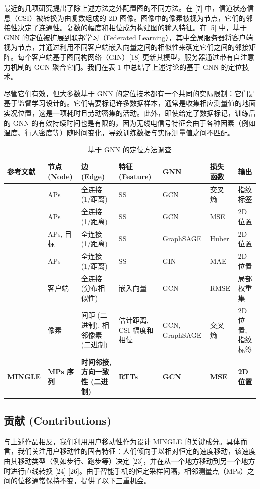 \documentclass[journal]{IEEEtran}
\begin{document}
最近的几项研究提出了除上述方法之外配置图的不同方法。在 [7] 中，信道状态信息（CSI）被转换为由复数组成的 2D 图像。图像中的像素被视为节点，它们的邻接性决定了连通性。复数的幅度和相位成为构建图的输入特征。在 [5] 中，基于 GNN 的定位被扩展到联邦学习（Federated Learning），其中全局服务器将客户端视为节点，并通过利用不同客户端嵌入向量之间的相似性来确定它们之间的邻接矩阵。每个客户端基于图同构网络（GIN）[18] 更新其模型，服务器通过带有自注意力机制的 GCN 聚合它们。我们在表 1 中总结了上述讨论的基于 GNN 的定位技术。

尽管它们有效，但大多数基于 GNN 的定位技术都有一个共同的实际限制：它们是基于监督学习设计的。它们需要标记许多数据样本，通常是收集相应测量值的地面实况位置，这是一项耗时且劳动密集的活动。此外，即使给定了数据标记，训练后的 GNN 的有效持续时间也是有限的，因为无线电信号特征会由于各种因素（例如温度、行人密度等）随时间变化，导致训练数据与实际测量值之间不匹配。

\begin{table}[t]
\caption{基于 GNN 的定位方法调查}
\centering
\begin{tabular}{|l|l|l|l|l|l|l|}
\hline
\textbf{参考文献} & \textbf{节点 (Node)} & \textbf{边 (Edge)} & \textbf{特征 (Feature)} & \textbf{GNN} & \textbf{损失函数} & \textbf{输出} \\ \hline
[2] & APs & 全连接 (1/距离) & SS & GCN & 交叉熵 & 指纹标签 \\ \hline
[3] & APs & 全连接 (1/距离) & SS & GCN & MSE & 2D 位置 \\ \hline
[4] & APs, 目标 & 全连接 (1/距离) & SS & GraphSAGE & Huber & 2D 位置 \\ \hline
[5] & APs & 全连接 (1/距离) & SS & GIN & MAE & 2D 位置 \\ \hline
[6] & 客户端 & 全连接 (分布相似性) & 嵌入向量 & GCN & RMSE & 局部权重集 \\ \hline
[7] & 像素 & 间距 (二进制), 相邻像素 (二进制) & 估计距离, CSI 幅度和相位 & GCN, GraphSAGE & 交叉熵 & 2D 位置, 指纹标签 \\ \hline
\textbf{MINGLE} & \textbf{MPs 序列} & \textbf{时间邻接, 方向一致性 (二进制)} & \textbf{RTTs} & \textbf{GCN} & \textbf{MSE} & \textbf{2D 位置} \\ \hline
\end{tabular}
\end{table}

\subsection{贡献 (Contributions)}
与上述作品相反，我们利用用户移动性作为设计 MINGLE 的关键成分。具体而言，我们关注用户移动性的固有特征：人们倾向于以相对恒定的速度移动，该速度由其移动类型（例如步行、跑步等）决定 [23]，并在从一个地方移动到另一个地方时进行直线转换 [24]-[26]。由于智能手机的恒定采样间隔，相邻测量点（MPs）之间的位移通常保持不变，提供了以下三重机会。
\end{document}
